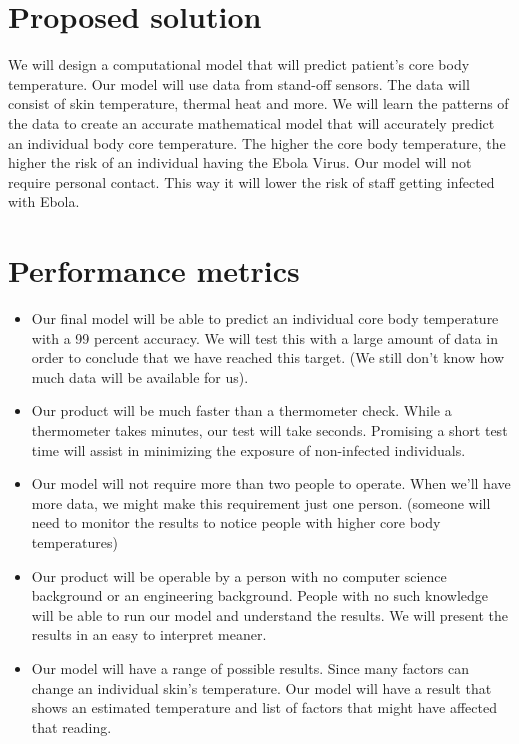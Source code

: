 \documentclass{article}
\begin{document}
\section{Proposed solution}
We will design a computational model that will predict patient’s core body temperature. Our model will use data from stand-off sensors. The data will consist of skin temperature, thermal heat and more. We will learn the patterns of the data to create an accurate mathematical model that will accurately predict an individual body core temperature. The higher the core body temperature, the higher the risk of an individual having the Ebola Virus. Our model will not require personal contact. This way it will lower the risk of staff getting infected with Ebola.

\section{Performance metrics}
\begin{itemize}
\item Our final model will be able to predict an individual core body temperature with a 99 percent accuracy. We will test this with a large amount of data in order to conclude that we have reached this target. (We still don’t know how much data will be available for us). 
\item Our product will be much faster than a thermometer check. While a thermometer takes minutes, our test will take seconds. Promising a short test time will assist in minimizing the exposure of non-infected individuals. 
\item Our model will not require more than two people to operate. When we’ll have more data, we might make this requirement just one person. (someone will need to monitor the results to notice people with higher core body temperatures)
\item Our product will be operable by a person with no computer science background or an engineering background. People with no such knowledge will be able to run our model and understand the results. We will present the results in an easy to interpret meaner.
\item Our model will have a range of possible results. Since many factors can change an individual skin’s temperature.  Our model will have a result that shows an estimated temperature and list of factors that might have affected that reading. 
\end{itemize}
\end{document}
